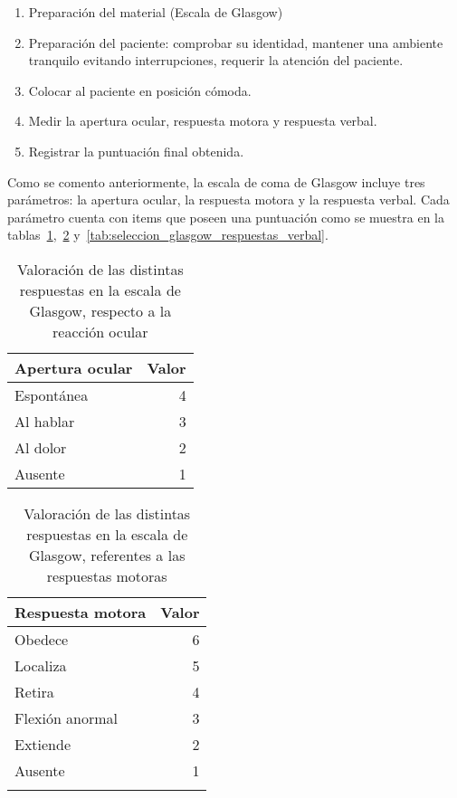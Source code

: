 \begin{enumerate}
\item Preparación del material (Escala de Glasgow)
\item Preparación del paciente: comprobar su identidad, mantener una ambiente
    tranquilo evitando interrupciones, requerir la atención del paciente.
\item Colocar al paciente en posición cómoda.
\item Medir la apertura ocular, respuesta motora y respuesta verbal.
\item Registrar la puntuación final obtenida.
\end{enumerate}

Como se comento anteriormente, la escala de coma de Glasgow incluye tres
parámetros: la apertura ocular, la respuesta motora y la respuesta verbal. Cada
parámetro cuenta con items que poseen una puntuación como se muestra en la
tablas~\ref{tab:seleccion_glasgow_respuestas_ocular},~\ref{tab:seleccion_glasgow_respuestas_motor}
y~\ref{tab:seleccion_glasgow_respuestas_verbal}. 

\begin{table}[!hbt]
\centering
\begin{tabular}{lr}
\toprule
\textbf{Apertura ocular} & \textbf{Valor} \\
\midrule
Espontánea & 4 \\
Al hablar & 3 \\
Al dolor & 2 \\
Ausente & 1 \\
\bottomrule
\end{tabular}
\caption{Valoración de las distintas respuestas en la escala de Glasgow,
    respecto a la reacción ocular}
\label{tab:seleccion_glasgow_respuestas_ocular}
\end{table}

\begin{table}[!hbt]
\centering
\begin{tabular}{lr}
\toprule
\textbf{Respuesta motora} & \textbf{Valor} \\
\midrule
Obedece & 6 \\
Localiza & 5 \\
Retira & 4 \\
Flexión anormal & 3 \\
Extiende & 2 \\
Ausente & 1 \\
 & \\
\bottomrule
\end{tabular}
\caption{Valoración de las distintas respuestas en la escala de Glasgow,
    referentes a las respuestas motoras}
\label{tab:seleccion_glasgow_respuestas_motor}
\end{table}

